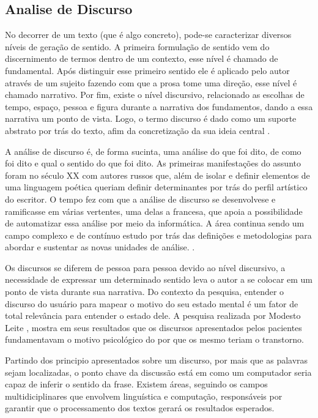 \subsection{Analise de Discurso}
No decorrer de um texto (que é algo concreto), pode-se caracterizar diversos níveis de geração de sentido.
A primeira formulação de sentido vem do discernimento de termos dentro de um contexto, esse nível é chamado de fundamental. Após distinguir esse primeiro sentido ele é aplicado pelo autor através de um sujeito fazendo com que a prosa tome uma direção, esse nível é chamado narrativo. Por fim, existe o nível discursivo, relacionado as escolhas de tempo, espaço, pessoa e figura durante a narrativa dos fundamentos, dando a essa narrativa um ponto de vista. Logo, o termo discurso é dado como um suporte abstrato por trás do texto, afim da concretização da sua ideia central \cite[13-17]{gregolin1995ad}.

A análise de discurso é, de forma sucinta, uma análise do que foi dito, de como foi dito e qual o sentido do que foi dito. As primeiras manifestações do assunto foram no século XX com autores russos que, além de isolar e definir elementos de uma linguagem poética queriam definir determinantes por trás do perfil artístico do escritor. O tempo fez com que a análise de discurso se desenvolvese e ramificasse em várias vertentes, uma delas a francesa, que apoia a possibilidade de automatizar essa análise por meio da informática. A área continua sendo um campo complexo e de contínuo estudo por trás das definições e metodologias para abordar e sustentar as novas unidades de análise. \cite[22]{souza2006ad}.

Os discursos se diferem de pessoa para pessoa devido ao nível discursivo, a necessidade de expressar um determinado sentido leva o autor a se colocar em um ponto de vista durante sua narrativa. Do contexto da pesquisa, entender o discurso do usuário para mapear o motivo do seu estado mental é um fator de total relevância para entender o estado dele. A pesquisa realizada por Modesto Leite \cite[134]{modesto2005adepre}, mostra em seus resultados que os discursos apresentados pelos pacientes fundamentavam o motivo psicológico do por que os mesmo teriam o transtorno. 

Partindo dos principio apresentados sobre um discurso, por mais que as palavras sejam localizadas, o ponto chave da discussão está em como um computador seria capaz de inferir o sentido da frase. Existem áreas, seguindo os campos multidiciplinares que envolvem linguística e computação, responsáveis por garantir que o processamento dos textos gerará os resultados esperados.
